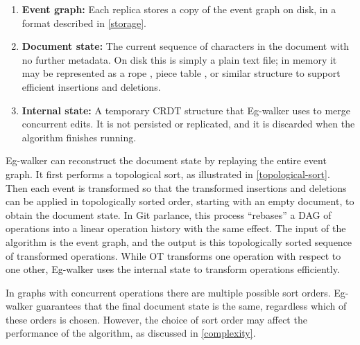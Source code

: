 \documentclass[sigplan,10pt]{acmart}
\newcommand{\algname}{Eg-walker\xspace}
\begin{document}
\begin{enumerate}
\item \textbf{Event graph:} Each replica stores a copy of the event graph on disk, in a format described in \autoref{storage}.
\item \textbf{Document state:} The current sequence of characters in the document with no further metadata. On disk this is simply a plain text file; in memory it may be represented as a rope \cite{Boehm1995}, piece table \cite{vscode-buffer}, or similar structure to support efficient insertions and deletions.
\item \textbf{Internal state:} A temporary CRDT structure that \algname uses to merge concurrent edits. It is not persisted or replicated, and it is discarded when the algorithm finishes running.
\end{enumerate}

\algname can reconstruct the document state by replaying the entire event graph.
It first performs a topological sort, as illustrated in \autoref{topological-sort}. Then each event is transformed so that the transformed insertions and deletions can be applied in topologically sorted order, starting with an empty document, to obtain the document state.
In Git parlance, this process ``rebases'' a DAG of operations into a linear operation history with the same effect.
The input of the algorithm is the event graph, and the output is this topologically sorted sequence of transformed operations.
While OT transforms one operation with respect to one other, \algname uses the internal state to transform operations efficiently.

In graphs with concurrent operations there are multiple possible sort orders. \algname guarantees that the final document state is the same, regardless which of these orders is chosen. However, the choice of sort order may affect the performance of the algorithm, as discussed in \autoref{complexity}.
\end{document}
